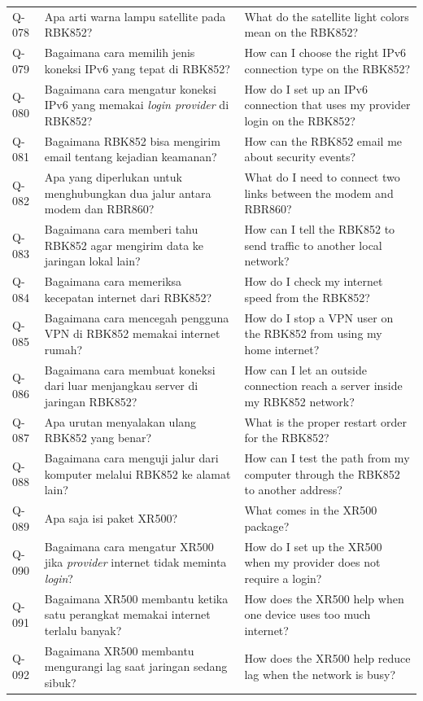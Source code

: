\begin{longtable}{@{}>{\RaggedRight\arraybackslash}p{1.6cm}>{\RaggedRight\arraybackslash}p{5.8cm}>{\RaggedRight\arraybackslash}p{\dimexpr\textwidth-1.6cm-5.8cm-4\tabcolsep\relax}@{}}
Q-078 & Apa arti warna lampu satellite pada RBK852? & What do the satellite light colors mean on the RBK852? \\
Q-079 & Bagaimana cara memilih jenis koneksi IPv6 yang tepat di RBK852? & How can I choose the right IPv6 connection type on the RBK852? \\
Q-080 & Bagaimana cara mengatur koneksi IPv6 yang memakai \emph{login provider} di RBK852? & How do I set up an IPv6 connection that uses my provider login on the RBK852? \\
Q-081 & Bagaimana RBK852 bisa mengirim email tentang kejadian keamanan? & How can the RBK852 email me about security events? \\
Q-082 & Apa yang diperlukan untuk menghubungkan dua jalur antara modem dan RBR860? & What do I need to connect two links between the modem and RBR860? \\
Q-083 & Bagaimana cara memberi tahu RBK852 agar mengirim data ke jaringan lokal lain? & How can I tell the RBK852 to send traffic to another local network? \\
Q-084 & Bagaimana cara memeriksa kecepatan internet dari RBK852? & How do I check my internet speed from the RBK852? \\
Q-085 & Bagaimana cara mencegah pengguna VPN di RBK852 memakai internet rumah? & How do I stop a VPN user on the RBK852 from using my home internet? \\
Q-086 & Bagaimana cara membuat koneksi dari luar menjangkau server di jaringan RBK852? & How can I let an outside connection reach a server inside my RBK852 network? \\
Q-087 & Apa urutan menyalakan ulang RBK852 yang benar? & What is the proper restart order for the RBK852? \\
Q-088 & Bagaimana cara menguji jalur dari komputer melalui RBK852 ke alamat lain? & How can I test the path from my computer through the RBK852 to another address? \\
Q-089 & Apa saja isi paket XR500? & What comes in the XR500 package? \\
Q-090 & Bagaimana cara mengatur XR500 jika \emph{provider} internet tidak meminta \emph{login}? & How do I set up the XR500 when my provider does not require a login? \\
Q-091 & Bagaimana XR500 membantu ketika satu perangkat memakai internet terlalu banyak? & How does the XR500 help when one device uses too much internet? \\
Q-092 & Bagaimana XR500 membantu mengurangi lag saat jaringan sedang sibuk? & How does the XR500 help reduce lag when the network is busy? \\

\end{longtable}
